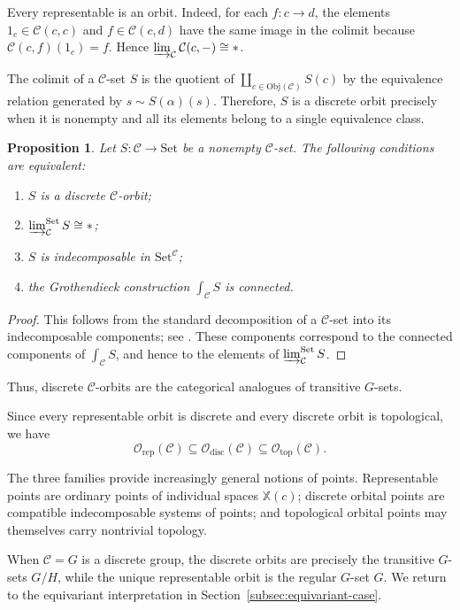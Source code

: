 \documentclass[12pt]{amsart}
\newtheorem{prop}[teo]{Proposition}
\theoremstyle{definition}
\theoremstyle{remark}
\numberwithin{figure}{section}%
\newcommand{\CC}{\mathcal{C}}
\newcommand{\X}{\mathbb{X}}
\newcommand{\Obj}{\mathrm{Obj}}
\newcommand{\Set}{\mathrm{Set}}
\begin{document}
Every representable is an orbit. Indeed, for each
$f\colon c\to d$, the elements $1_c\in\CC(c,c)$ and
$f\in\CC(c,d)$ have the same image in the colimit because
$\CC(c,f)(1_c)=f$. Hence
$\varinjlim_{\CC}\CC(c,-)\cong *$.

The colimit of a $\CC$-set $S$ is the quotient of
$\coprod_{c\in\Obj(\CC)}S(c)$ by the equivalence relation generated by
$s\sim S(\alpha)(s)$. Therefore, $S$ is a discrete orbit precisely when
it is nonempty and all its elements belong to a single equivalence class.

\begin{prop}\label{prop:discrete-orbit-indecomposable}
Let $S\colon\CC\to\Set$ be a nonempty $\CC$-set. The following
conditions are equivalent:
\begin{enumerate}
    \item $S$ is a discrete $\CC$-orbit;
    \item $\varinjlim_{\CC}^{\Set}S\cong *$;
    \item $S$ is indecomposable in $\Set^{\CC}$;
    \item the Grothendieck construction $\int_{\CC}S$ is connected.
\end{enumerate}
\end{prop}

\begin{proof}
This follows from the standard decomposition of a $\CC$-set into its
indecomposable components; see \cite{Webb2023}. These
components correspond to the connected components of
$\int_{\CC}S$, and hence to the elements of
$\varinjlim_{\CC}^{\Set}S$.
\end{proof}

Thus, discrete $\CC$-orbits are the categorical analogues of transitive
$G$-sets.

Since every representable orbit is discrete and every
discrete orbit is topological, we have
\[
\mathcal O_{\mathrm{rep}}(\CC)
\subseteq
\mathcal O_{\mathrm{disc}}(\CC)
\subseteq
\mathcal O_{\mathrm{top}}(\CC).
\]

The three families provide increasingly general notions of points.
Representable points are ordinary points of individual spaces $\X(c)$;
discrete orbital points are compatible indecomposable systems of points;
and topological orbital points may themselves carry nontrivial topology.

When $\CC=G$ is a discrete group, the discrete orbits are precisely the
transitive $G$-sets $G/H$, while the unique representable orbit is the
regular $G$-set $G$. We return to the equivariant interpretation in
Section~\ref{subsec:equivariant-case}.
\end{document}
